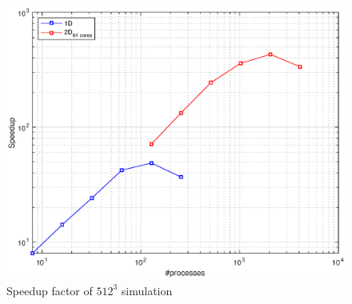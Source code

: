 \begin{figure}
\begin{center}
\includegraphics[scale=0.6]{grafici/5122}
\caption{Speedup factor of $512^3$ simulation}
\label{5122}
\end{center}
\end{figure}

